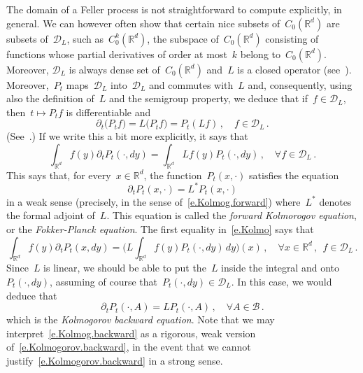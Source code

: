 \documentclass[11pt]{article} %
\numberwithin{equation}{section}
\theoremstyle{definition}
\newcommand*{\Rd}{\ensuremath{\mathbb{R}^d}}
\begin{document}
The domain of a Feller process is not straightforward to compute explicitly, in general. We can however often show that certain nice subsets of~$C_0(\Rd)$ are subsets of~$\mathscr{D}_L$, such as~$C^k_0(\Rd)$, the subspace of~$C_0(\Rd)$ consisting of functions whose partial derivatives of order at most~$k$ belong to~$C_0(\Rd)$. Moreover, $\mathscr{D}_L$ is always dense set of~$C_0(\Rd)$ and~$L$ is a closed operator (see~\cite[VII.1.3]{RY}). 
Moreover,~$P_t$ maps~$\mathscr{D}_L$ into~$\mathscr{D}_L$ and commutes with~$L$ and,  consequently, using also the definition of~$L$ and the semigroup property, we deduce that if~$f\in \mathscr{D}_L$, then~$t \mapsto P_t f$ is differentiable and
\begin{equation}
\label{e.Kolmo}
\partial_t \bigl( P_t f \bigr) = L \bigl( P_t f \bigr) = P_t ( Lf) \,, \quad f\in \mathscr{D}_L\,.
\end{equation}
(See~\cite[VII.1.2]{RY}.) If we write this a bit more explicitly, it says that 
\begin{equation}
\label{e.Kolmog.forward}
\int_{\Rd} f(y) \partial_t P_t(\cdot,dy) = 
\int_{\Rd} Lf (y) P_t(\cdot,dy) 
\,, \quad \forall f \in \mathscr{D}_L\,.
\end{equation}
This says that, for every~$x\in\Rd$, the function~$P_t(x,\cdot)$ satisfies the equation
\begin{equation}
\label{e.Kolmogorov.forward.weak}
\partial_t P_t(x,\cdot) = L^* P_t(x,\cdot)
\end{equation}
in a weak sense (precisely, in the sense of~\eqref{e.Kolmog.forward}) where~$L^*$ denotes the formal adjoint of~$L$.
This equation is called the \emph{forward Kolmorogov equation}, or the \emph{Fokker-Planck equation}. 
The first equality in~\eqref{e.Kolmo} says that 
\begin{equation}
\label{e.Kolmog.backward}
\int_{\Rd} f(y) \partial_t  P_t(x,dy) = 
\biggr( L\int_{\Rd} f (y)  P_t(\cdot,dy) \, dy \biggr)(x) 
\,, \quad \forall x\in\Rd\,, \ \ f \in \mathscr{D}_L\,.
\end{equation}
Since~$L$ is linear, we should be able to put the~$L$ inside the integral and onto~$P_t(\cdot,dy)$, assuming of course that~$P_t(\cdot,dy) \in \mathscr{D}_L$. In this case, we would deduce that 
\begin{equation}
\label{e.Kolmogorov.backward}
\partial_t P_t(\cdot,A) = LP_t(\cdot,A) \,, \quad \forall A\in \mathscr{B}\,.
\end{equation}
which is the \emph{Kolmogorov backward equation}. Note that we may interpret~\eqref{e.Kolmog.backward} as a rigorous, weak version of~\eqref{e.Kolmogorov.backward}, in the event that we cannot justify~\eqref{e.Kolmogorov.backward} in a strong sense. 
\end{document}
